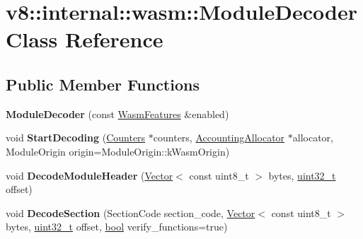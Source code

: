 \hypertarget{classv8_1_1internal_1_1wasm_1_1ModuleDecoder}{}\section{v8\+:\+:internal\+:\+:wasm\+:\+:Module\+Decoder Class Reference}
\label{classv8_1_1internal_1_1wasm_1_1ModuleDecoder}
\subsection*{Public Member Functions}
\begin{DoxyCompactItemize}
\item 
\mbox{\label{classv8_1_1internal_1_1wasm_1_1ModuleDecoder_a86619ce9a7e055eac7e264f235a88331}} 
{\bfseries Module\+Decoder} (const \mbox{\hyperlink{structv8_1_1internal_1_1wasm_1_1WasmFeatures}{Wasm\+Features}} \&enabled)
\item 
\mbox{\label{classv8_1_1internal_1_1wasm_1_1ModuleDecoder_a4dbb956f6756d3f1283c9f1b344ad6f4}} 
void {\bfseries Start\+Decoding} (\mbox{\hyperlink{classv8_1_1internal_1_1Counters}{Counters}} $\ast$counters, \mbox{\hyperlink{classv8_1_1internal_1_1AccountingAllocator}{Accounting\+Allocator}} $\ast$allocator, Module\+Origin origin=Module\+Origin\+::k\+Wasm\+Origin)
\item 
\mbox{\label{classv8_1_1internal_1_1wasm_1_1ModuleDecoder_a33d5a99c554875a3a9356bf5858c68e1}} 
void {\bfseries Decode\+Module\+Header} (\mbox{\hyperlink{classv8_1_1internal_1_1Vector}{Vector}}$<$ const uint8\+\_\+t $>$ bytes, \mbox{\hyperlink{classuint32__t}{uint32\+\_\+t}} offset)
\item 
\mbox{\label{classv8_1_1internal_1_1wasm_1_1ModuleDecoder_a70d614231ff5a6452c42544bc29bad50}} 
void {\bfseries Decode\+Section} (Section\+Code section\+\_\+code, \mbox{\hyperlink{classv8_1_1internal_1_1Vector}{Vector}}$<$ const uint8\+\_\+t $>$ bytes, \mbox{\hyperlink{classuint32__t}{uint32\+\_\+t}} offset, \mbox{\hyperlink{classbool}{bool}} verify\+\_\+functions=true)
\item 
\mbox{\label{classv8_1_1internal_1_1wasm_1_1ModuleDecoder_aebc5f747df388a7206ca345dfeee9ca0}} 

\end{DoxyCompactItemize}

